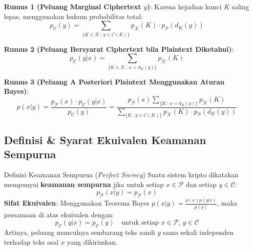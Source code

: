 \documentclass[11pt,a4paper]{article}
\begin{document}
\noindent\textbf{Rumus 1 (Peluang Marginal Ciphertext $y$)}:
Karena kejadian kunci $K$ saling lepas, menggunakan hukum probabilitas total:
\begin{equation}
\label{eq:marginal_py}
p_{\mathcal{C}}(y) = \sum_{\{K \in \mathcal{K} \,:\, y \in C(K)\}} p_{\mathcal{K}}(K) \cdot p_{\mathcal{P}}(d_K(y))
\end{equation}

\noindent\textbf{Rumus 2 (Peluang Bersyarat Ciphertext bila Plaintext Diketahui)}:
\begin{equation}
\label{eq:conditional_pyx}
p_{\mathcal{C}}(y|x) = \sum_{\{K \in \mathcal{K} \,:\, x = d_K(y)\}} p_{\mathcal{K}}(K)
\end{equation}

\noindent\textbf{Rumus 3 (Peluang A Posteriori Plaintext Menggunakan Aturan Bayes)}:
\begin{equation}
\label{eq:bayes_pxy}
p(x|y) = \frac{p_{\mathcal{P}}(x) \cdot p_{\mathcal{C}}(y|x)}{p_{\mathcal{C}}(y)} = \frac{p_{\mathcal{P}}(x) \displaystyle\sum_{\{K \,:\, x = d_K(y)\}} p_{\mathcal{K}}(K)}{\displaystyle\sum_{\{K \,:\, y \in C(K)\}} p_{\mathcal{K}}(K) \cdot p_{\mathcal{P}}(d_K(y))}
\end{equation}

\subsection{Definisi \& Syarat Ekuivalen Keamanan Sempurna}

\begin{conceptbox}{Definisi Keamanan Sempurna (\textit{Perfect Secrecy})}
Suatu sistem kripto dikatakan mempunyai \textbf{keamanan sempurna} jika untuk setiap $x \in \mathcal{P}$ dan setiap $y \in \mathcal{C}$:
\begin{equation}
\label{eq:perfect_secrecy}
p_{\mathcal{P}}(x|y) = p_{\mathcal{P}}(x)
\end{equation}
\textbf{Sifat Ekuivalen}:
Menggunakan Teorema Bayes $p(x|y) = \frac{p(x)p(y|x)}{p(y)}$, maka persamaan di atas ekuivalen dengan:
\begin{equation}
\label{eq:perfect_secrecy_equiv}
p_{\mathcal{C}}(y|x) = p_{\mathcal{C}}(y) \quad \text{untuk setiap } x \in \mathcal{P}, \, y \in \mathcal{C}
\end{equation}
Artinya, peluang munculnya sembarang teks sandi $y$ sama sekali independen terhadap teks asal $x$ yang dikirimkan.
\end{conceptbox}
\end{document}
